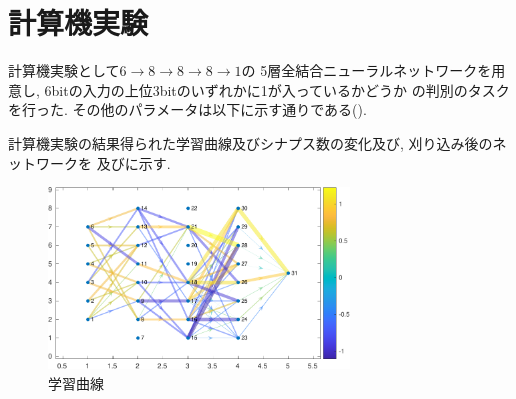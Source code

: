 \documentclass[a4paper, 9pt,twocolumn,dvipdfmx]{jsarticle}
\begin{document}
\section{計算機実験}
計算機実験として$6\rightarrow 8\rightarrow 8\rightarrow 8\rightarrow 1$の
5層全結合ニューラルネットワークを用意し, 
6bitの入力の上位3bitのいずれかに1が入っているかどうか
の判別のタスクを行った.
その他のパラメータは以下に示す通りである().
\vspace{-0.5cm}
\begin{table}[H]
  \caption{パラメータ一覧}
  \label{tab:param}
  \centering
 \end{table}
計算機実験の結果得られた学習曲線及びシナプス数の変化及び, 刈り込み後のネットワークを
及びに示す.
\begin{figure}[H]
  \centering
  \includegraphics[width=8cm]{Graph-crop.pdf} 
  \caption{学習曲線}
  \label{fig:Graph}
\end{figure}
\end{document}
